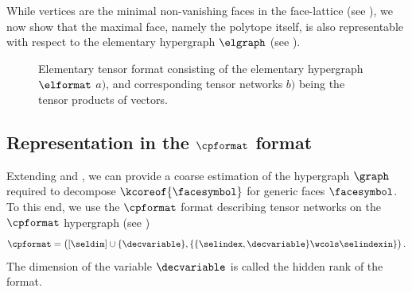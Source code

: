 

While vertices are the minimal non-vanishing faces in the face-lattice (see \cite{ziegler_lectures_2013}), we now show that the maximal face, namely the polytope itself, is also representable with respect to the elementary hypergraph $\elgraph$ (see ).



\begin{figure}
    
    \caption{Elementary tensor format consisting of the elementary hypergraph $\elformat$ $a)$, and corresponding tensor networks $b)$ being the tensor products of vectors.}
    \label{fig:elFormat}
\end{figure}


\subsection{Representation in the $\cpformat$ format}

Extending  and , we can provide a coarse estimation of the hypergraph $\graph$ required to decompose $\kcoreof{\facesymbol}$ for generic faces $\facesymbol$.
To this end, we use the $\cpformat$ format describing tensor networks on the $\cpformat$ hypergraph (see )
\begin{align*}
    \cpformat
    = \big([\seldim]\cup\{\decvariable\},\{\{\selindex,\decvariable\}\wcols\selindexin\}\big) \, .
\end{align*}
The dimension of the variable $\decvariable$ is called the hidden rank of the format.

